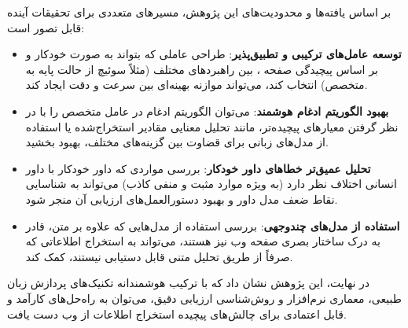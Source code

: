 
بر اساس یافته‌ها و محدودیت‌های این پژوهش، مسیرهای متعددی برای تحقیقات آینده قابل تصور است:
\begin{itemize}
    \item \textbf{توسعه عامل‌های ترکیبی و تطبیق‌پذیر}: طراحی عاملی که بتواند به صورت خودکار و بر اساس پیچیدگی صفحه ، بین راهبردهای مختلف (مثلاً سوئیچ از حالت پایه به متخصص) انتخاب کند، می‌تواند موازنه بهینه‌ای بین سرعت و دقت ایجاد کند.

    \item \textbf{بهبود الگوریتم ادغام هوشمند}: می‌توان الگوریتم ادغام در عامل متخصص را با در نظر گرفتن معیارهای پیچیده‌تر، مانند تحلیل معنایی مقادیر استخراج‌شده یا استفاده از مدل‌های زبانی برای قضاوت بین گزینه‌های مختلف، بهبود بخشید.

    \item \textbf{تحلیل عمیق‌تر خطاهای داور خودکار}: بررسی مواردی که داور خودکار با داور انسانی اختلاف نظر دارد (به ویژه موارد مثبت و منفی کاذب) می‌تواند به شناسایی نقاط ضعف مدل داور و بهبود دستورالعمل‌های ارزیابی آن منجر شود.

    \item \textbf{استفاده از مدل‌های چندوجهی}: بررسی استفاده از مدل‌هایی که علاوه بر متن، قادر به درک ساختار بصری صفحه وب نیز هستند، می‌تواند به استخراج اطلاعاتی که صرفاً از طریق تحلیل متنی قابل دستیابی نیستند، کمک کند.

\end{itemize}

در نهایت، این پژوهش نشان داد که با ترکیب هوشمندانه تکنیک‌های پردازش زبان طبیعی، معماری نرم‌افزار و روش‌شناسی ارزیابی دقیق، می‌توان به راه‌حل‌های کارآمد و قابل اعتمادی برای چالش‌های پیچیده استخراج اطلاعات از وب دست یافت.
